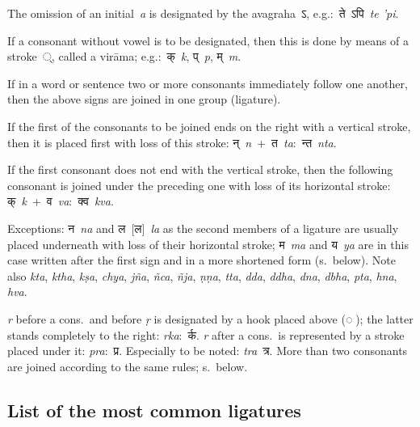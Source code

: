 \documentclass{article}
\newcommand{\siddhanta}[1]{\mbox{\Siddhanta#1}}
\newcommand{\siddhantaII}[1]{\mbox{\SiddhantaII#1}}
\newcommand{\lingual}[1]{\textit{#1}}
\newcommand{\siddhantalingual}[2]{\siddhanta{#1}~\lingual{#2}}
\newcommand{\alt}[2]{#1~[#2]}
\newcommand{\siddhantaIIsiddhanta}[2]{\alt{\siddhantaII{#1}}{\siddhanta{#2}}}
\newcommand{\siddhantaIIsiddhantalingual}[3]{\siddhantaIIsiddhanta{#1}{#2}~\lingual{#3}}
\begin{document}
The omission of an initial~\lingual{a} is designated by the avagraha~\siddhanta{ऽ}, e.g.:~\siddhantalingual{ते ऽपि}{te 'pi}.

If a consonant without vowel is to be designated, then this is done by means of a stroke~\siddhanta{्}, called a virāma; e.g.:~\siddhantalingual{क्}{k}, \siddhantalingual{प्}{p}, \siddhantalingual{म्}{m}.

If in a word or sentence two or more consonants immediately follow one another, then the above signs are joined in one group (ligature).

If the first of the consonants to be joined ends on the right with a vertical stroke, then it is placed first with loss of this stroke: \siddhantalingual{न्}{n}~+~\siddhantalingual{त}{ta}:~\siddhantalingual{न्त}{nta}.

If the first consonant does not end with the vertical stroke, then the following consonant is joined under the preceding one with loss of its horizontal stroke: \siddhantalingual{क्}{k}~+~\siddhantalingual{व}{va}:~\siddhantalingual{क्व}{kva}.

Exceptions: \siddhantalingual{न}{na} and \siddhantaIIsiddhantalingual{ल}{ल}{la} as the second members of a ligature are usually placed underneath with loss of their horizontal stroke; \siddhantalingual{म}{ma} and \siddhantalingual{य}{ya} are in this case written after the first sign and in a more shortened form (s.~below). Note also \lingual{kta}, \lingual{ktha}, \lingual{kṣa}, \lingual{chya}, \lingual{jña}, \lingual{ñca}, \lingual{ñja}, \lingual{ṇṇa}, \lingual{tta}, \lingual{dda}, \lingual{ddha}, \lingual{dna}, \lingual{dbha}, \lingual{pta}, \lingual{hna}, \lingual{hva}.

\lingual{r} before a cons.\ and before \lingual{ṛ} is designated by a hook placed above (\siddhanta{◌}); the latter stands completely to the right: \lingual{rka}:~\siddhanta{र्क}. \lingual{r} after a cons.\ is represented by a stroke placed under it: \lingual{pra}:~\siddhanta{प्र}. Especially to be noted: \lingual{tra}~\siddhanta{त्र}. More than two consonants are joined according to the same rules; s.~below.



\subsection*{List of the most common ligatures}
\end{document}
